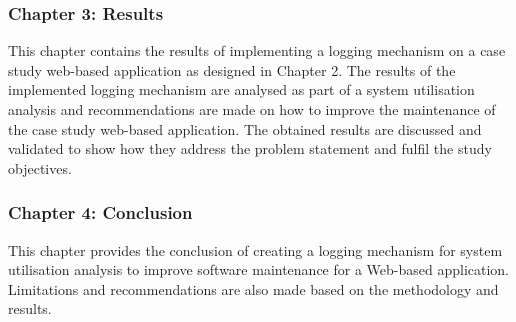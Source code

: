 \subsubsection{Chapter 3: Results}
This chapter contains the results of implementing a logging mechanism on a case study web-based application as designed in Chapter 2. The results of the implemented logging mechanism are analysed as part of a system utilisation analysis and recommendations are made on how to improve the maintenance of the case study web-based application. The obtained results are discussed and validated to show how they address the problem statement and fulfil the study objectives.

\subsubsection{Chapter 4: Conclusion}
This chapter provides the conclusion of creating a logging mechanism for system utilisation analysis to improve software maintenance for a Web-based application. Limitations and recommendations are also made based on the methodology and results.
